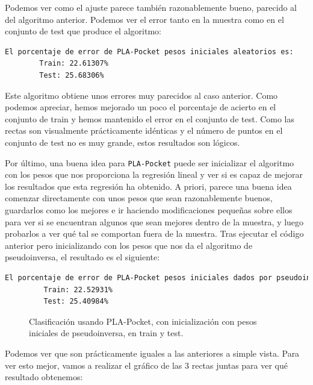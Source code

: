\documentclass[12pt]{article}
\begin{document}
{Podemos ver como el ajuste parece también razonablemente bueno, parecido al del algoritmo anterior. Podemos ver el error tanto en la muestra como en el conjunto de test que produce el algoritmo:
\begin{lstlisting}[language=bash]
  El porcentaje de error de PLA-Pocket pesos iniciales aleatorios es:
        Train: 22.61307%
        Test: 25.68306%
\end{lstlisting}

Este algoritmo obtiene unos errores muy parecidos al caso anterior. 
Como podemos apreciar, hemos mejorado un poco el porcentaje de acierto  en el conjunto de train y hemos mantenido el error en el conjunto de test. Como las rectas son visualmente
prácticamente idénticas y el número de puntos en el conjunto de test no es muy grande, estos resultados son lógicos.

Por último, una buena idea para \lstinline{PLA-Pocket} puede ser inicializar el algoritmo con los pesos que nos proporciona la regresión lineal y ver si es capaz de mejorar los resultados 
que esta regresión ha obtenido. A priori, parece una buena idea comenzar directamente con unos pesos que sean razonablemente buenos, guardarlos como los mejores e ir haciendo modificaciones pequeñas sobre ellos para ver si se encuentran algunos que sean mejores dentro de la muestra, y luego probarlos a ver qué tal se comportan fuera de la muestra.  Tras ejecutar el código anterior pero inicializando con los pesos que nos da el algoritmo de pseudoinversa, el resultado es el siguiente:
\begin{lstlisting}[language=bash]
  El porcentaje de error de PLA-Pocket pesos iniciales dados por pseudoinversa es:
         Train: 22.52931%
         Test: 25.40984%
\end{lstlisting}


\begin{figure}[H]
  \centering
  \qquad
  \caption{Clasificación usando PLA-Pocket, con inicialización con pesos iniciales de pseudoinversa, en train y test.}
\label{fig:myfig:5}
\end{figure}
Podemos ver que son prácticamente iguales a las anteriores a simple vista. Para ver esto mejor, vamos a realizar el gráfico de las 3 rectas juntas para ver qué resultado obtenemos:

}
\end{document}
